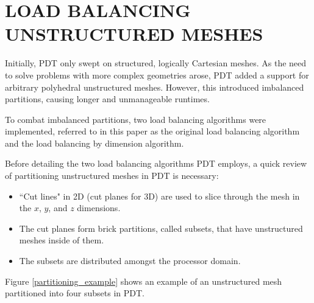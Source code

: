 %
%
%
%

\chapter{LOAD BALANCING UNSTRUCTURED MESHES}

Initially, PDT only swept on structured, logically Cartesian meshes. As the need to solve problems with more complex geometries arose, PDT added a support for arbitrary polyhedral unstructured meshes. However, this introduced imbalanced partitions, causing longer and unmanageable runtimes.

To combat imbalanced partitions, two load balancing algorithms were implemented, referred to in this paper as the original load balancing algorithm and the load balancing by dimension algorithm.

Before detailing the two load balancing algorithms PDT employs, a quick review of partitioning unstructured meshes in PDT is necessary:
\begin{itemize}\itemsep 1pt \parskip 0pt \parsep 0pt
\item ``Cut lines" in 2D (cut planes for 3D) are used to slice through the mesh in the $x$, $y$, and $z$ dimensions.
\item The cut planes form brick partitions, called subsets, that have unstructured meshes inside of them. 
\item The subsets are distributed amongst the processor domain.
\end{itemize}
Figure \ref{partitioning_example} shows an example of an unstructured mesh partitioned into four subsets in PDT. 

